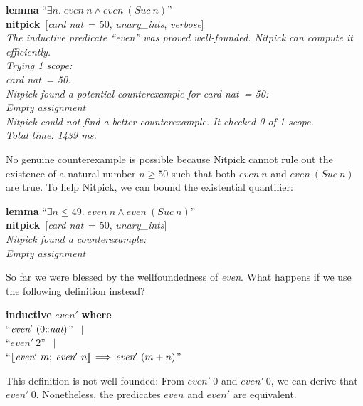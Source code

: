 \documentclass[a4paper,12pt]{article}
\def\Colon{\mathord{:\mkern-1.5mu:}}
\begin{document}
\prew
\textbf{lemma} ``$\exists n.\; \textit{even}~n \mathrel{\land} \textit{even}~(\textit{Suc}~n)$'' \\
\textbf{nitpick}~[\textit{card nat}~= 50, \textit{unary\_ints}, \textit{verbose}] \\[2\smallskipamount]
\slshape The inductive predicate ``\textit{even}'' was proved well-founded.
Nitpick can compute it efficiently. \\[2\smallskipamount]
Trying 1 scope: \\
\hbox{}\qquad \textit{card nat}~= 50. \\[2\smallskipamount]
Nitpick found a potential counterexample for \textit{card nat}~= 50: \\[2\smallskipamount]
\hbox{}\qquad Empty assignment \\[2\smallskipamount]
Nitpick could not find a better counterexample. It checked 0 of 1 scope. \\[2\smallskipamount]
Total time: 1439 ms.
\postw

No genuine counterexample is possible because Nitpick cannot rule out the
existence of a natural number $n \ge 50$ such that both $\textit{even}~n$ and
$\textit{even}~(\textit{Suc}~n)$ are true. To help Nitpick, we can bound the
existential quantifier:

\prew
\textbf{lemma} ``$\exists n \mathbin{\le} 49.\; \textit{even}~n \mathrel{\land} \textit{even}~(\textit{Suc}~n)$'' \\
\textbf{nitpick}~[\textit{card nat}~= 50, \textit{unary\_ints}] \\[2\smallskipamount]
\slshape Nitpick found a counterexample: \\[2\smallskipamount]
\hbox{}\qquad Empty assignment
\postw

So far we were blessed by the wellfoundedness of \textit{even}. What happens if
we use the following definition instead?

\prew
\textbf{inductive} $\textit{even}'$ \textbf{where} \\
``$\textit{even}'~(0{\Colon}\textit{nat})$'' $\,\mid$ \\
``$\textit{even}'~2$'' $\,\mid$ \\
``$\mathopen{[\![}\textit{even}'~m;\> \textit{even}'~n\mathclose{]\!]} \,\Longrightarrow\, \textit{even}'~(m + n)$''
\postw

This definition is not well-founded: From $\textit{even}'~0$ and
$\textit{even}'~0$, we can derive that $\textit{even}'~0$. Nonetheless, the
predicates $\textit{even}$ and $\textit{even}'$ are equivalent.
\end{document}
